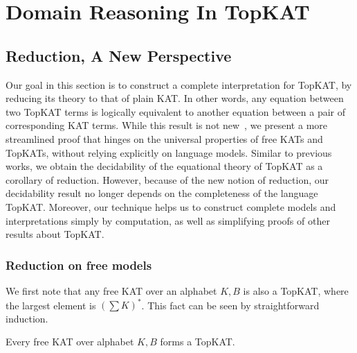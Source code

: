 \chapter{Domain Reasoning In TopKAT}
\label{chapter:TopKAT}
\thispagestyle{myheadings}




\section{Reduction, A New Perspective}
\label{sec: general completeness}

Our goal in this section is to construct a complete interpretation for TopKAT,
by reducing its theory to that of plain KAT.  In other words, any equation
between two TopKAT terms is logically equivalent to another equation between a
pair of corresponding KAT terms.  While this result is not
new~\cite{Zhang_de_Amorim_Gaboardi_2022, Zhang_de_Amorim_Gaboardi_2022_POPL,
  Pous_Wagemaker_2022}, we present a more streamlined proof that hinges on the
universal properties of free KATs and TopKATs, without relying explicitly on
language models.  Similar to previous works, we obtain the
decidability of the equational theory of TopKAT as a corollary of reduction.
However, because of the new notion of reduction,
our decidability result no longer depends on the completeness of the language TopKAT.  
Moreover, our technique helps us to construct complete models and interpretations 
simply by computation, as well as simplifying proofs of other results about TopKAT.


\subsection{Reduction on free models}\label{sec: reduction on free models}

We first note that any free KAT over an alphabet \(K, B\) is also a TopKAT,
where the largest element is \((∑ K)^*\). This fact can be seen by
straightforward induction.

\begin{lemma}\label{the: every free KAT is a TopKAT}
    Every free KAT over alphabet \(K, B\) forms a TopKAT.
\end{lemma}

